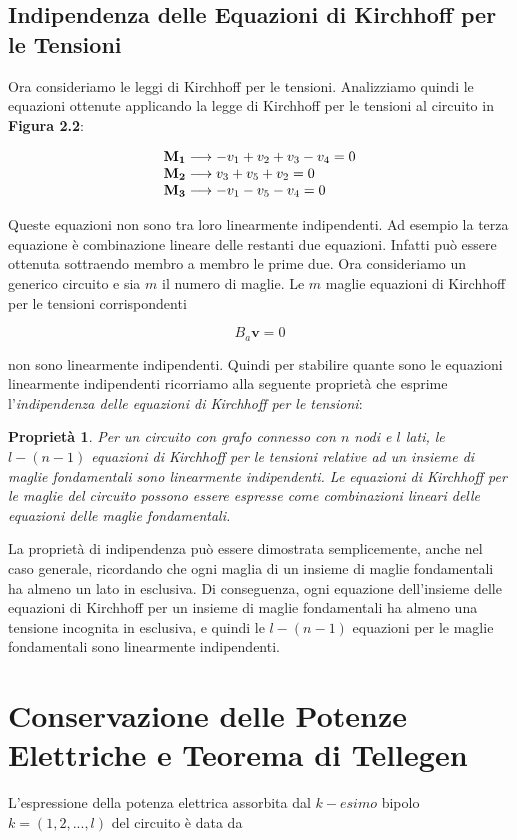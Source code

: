 \documentclass[a4paper]{report}
\newtheorem{prop}{Propriet\`a}
\begin{document}
\subsection{Indipendenza delle Equazioni di Kirchhoff per le Tensioni}

Ora consideriamo le leggi di Kirchhoff per le tensioni. Analizziamo
quindi le equazioni ottenute applicando la legge di Kirchhoff per le
tensioni al circuito in {\bf Figura 2.2}:

\[
\begin{array}{l l l}
  \mathbf{M_1}\longrightarrow -v_1+v_2+v_3-v_4=0\\
  \mathbf{M_2}\longrightarrow v_3+v_5+v_2=0\\
  \mathbf{M_3}\longrightarrow -v_1-v_5-v_4=0  
\end{array}  
\]

Queste equazioni non sono tra loro linearmente indipendenti. Ad
esempio la terza equazione \`e combinazione lineare delle restanti due
equazioni. Infatti pu\`o essere ottenuta sottraendo membro a membro
le prime due.
Ora consideriamo un generico circuito e sia $m$ il numero di
maglie. Le $m$ maglie equazioni di Kirchhoff per le tensioni
corrispondenti

\[
B_a\mathbf{v}=0
\]

non sono linearmente indipendenti. Quindi per stabilire quante sono le
equazioni linearmente indipendenti ricorriamo alla seguente
propriet\`a che esprime l'\emph{indipendenza delle equazioni di
  Kirchhoff per le tensioni}:

\begin{prop}
  Per un circuito con grafo connesso con $n$ nodi e $l$ lati, le
  $l-(n-1)$ equazioni di Kirchhoff per le tensioni relative ad un
  insieme di maglie fondamentali sono linearmente indipendenti. Le
  equazioni di Kirchhoff per le maglie del circuito possono essere
  espresse come combinazioni lineari delle equazioni delle maglie fondamentali.
\end{prop}

La propriet\`a di indipendenza pu\`o essere dimostrata semplicemente,
anche nel caso generale, ricordando che ogni maglia di un insieme di
maglie fondamentali ha almeno un lato in esclusiva. Di conseguenza,
ogni equazione dell'insieme delle equazioni di Kirchhoff per un
insieme di maglie fondamentali ha almeno una tensione incognita in
esclusiva, e quindi le $l-(n-1)$ equazioni per le maglie fondamentali
sono linearmente indipendenti.

\section{Conservazione delle Potenze Elettriche e Teorema di Tellegen}
L'espressione della potenza elettrica assorbita dal $k-esimo$ bipolo
$k=(1, 2,..., l)$ del circuito \`e data da
\end{document}
